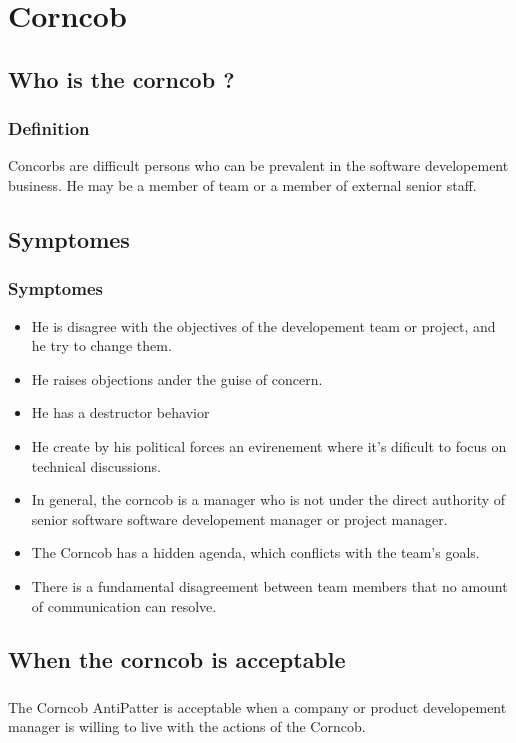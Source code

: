 \documentclass{beamer}
\begin{document}
\section{Corncob}
\subsection{Who is the corncob ?}
\begin{frame}
\frametitle{Definition}
Concorbs are difficult persons who can be prevalent in the software developement business. He may be a member of team or a member of external senior staff.


\end{frame}

\subsection{Symptomes}
\begin{frame}
\frametitle{Symptomes}
\begin{itemize}
\item He is disagree with the objectives of the developement team or project, and he try to change them.
\item He raises objections ander the guise of concern.
\item He has a destructor behavior
\item He create by his political forces an evirenement where it's dificult to focus on technical discussions.
\item In general, the corncob is a manager who is not under the direct authority of senior software software developement manager or project manager.
\item The Corncob has a hidden agenda, which conflicts with the team’s goals.
\item There is a fundamental disagreement between team members that no amount of communication can resolve.
\end{itemize}
\end{frame}

\subsection{When the corncob is acceptable}
\begin{frame}
\frametitle{}
The Corncob AntiPatter is acceptable when a company or product developement manager is willing to live with the actions of the Corncob.
\end{frame}
\end{document}
